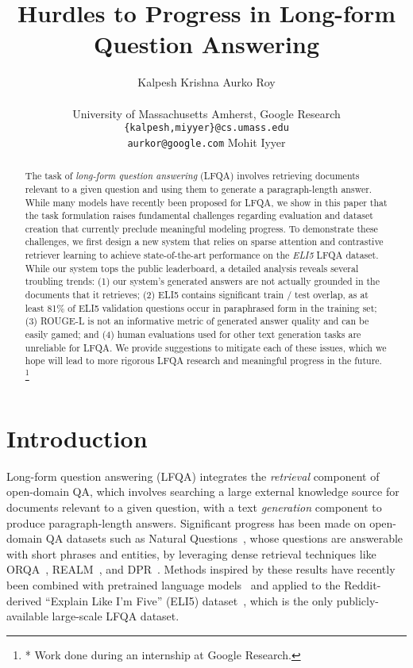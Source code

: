 \documentclass[11pt]{article}
\title{Hurdles to Progress in Long-form Question Answering}
\author{Kalpesh Krishna \And Aurko Roy \\\\ University of Massachusetts Amherst, Google Research \\ \texttt{\{kalpesh,miyyer\}@cs.umass.edu}\\ \texttt{aurkor@google.com} \And Mohit Iyyer}
\newcommand\blfootnote[1]{\begingroup
  \renewcommand\thefootnote{}\footnote{#1}\addtocounter{footnote}{-1}\endgroup
}
\begin{document}
\maketitle
\begin{abstract}

The task of \emph{long-form question answering} (LFQA) involves retrieving documents relevant to a given question and using them to generate a paragraph-length answer. While many models have recently been proposed for LFQA, we show in this paper that the task formulation raises fundamental challenges regarding evaluation and dataset creation that currently preclude meaningful modeling progress. To demonstrate these challenges, we first design a new system that relies on sparse attention and
contrastive retriever learning to achieve state-of-the-art performance on the \emph{ELI5} LFQA dataset. While our system tops the public leaderboard, a detailed analysis reveals several troubling trends: (1) our system's generated answers are not actually grounded in the documents that it retrieves; (2) ELI5 contains significant train / test overlap, as at least 81\% of ELI5 validation questions occur in paraphrased form in the training set; (3) ROUGE-L is not an informative metric of generated answer quality and can be easily gamed; and (4) human evaluations used for other text generation tasks are unreliable for LFQA. We provide suggestions to mitigate each of these issues, which we hope will lead to more rigorous LFQA research and meaningful progress in the future.\blfootnote{* Work done during an internship at Google Research.}

\end{abstract} \section{Introduction}

Long-form question answering (LFQA) integrates the \emph{retrieval} component of open-domain QA, which involves searching a large external knowledge source for documents relevant to a given question, with a text \emph{generation} component to produce paragraph-length answers. Significant progress has been made on open-domain QA datasets such as Natural Questions~\citep{kwiatkowski2019natural}, whose questions are answerable with short phrases and entities, by leveraging dense retrieval techniques like ORQA~\citep{lee-etal-2019-latent}, REALM~\citep{guu2020realm}, and DPR~\citep{karpukhin2020dense,lewis2020retrieval,izacard2020leveraging}. Methods inspired by these results have recently been combined with pretrained language models~\citep{lewis2019bart,petroni2020kilt} and applied to the Reddit-derived ``Explain Like I'm Five'' (ELI5) dataset~\citep{fan-etal-2019-eli5}, which is the only publicly-available large-scale LFQA dataset.
\end{document}
